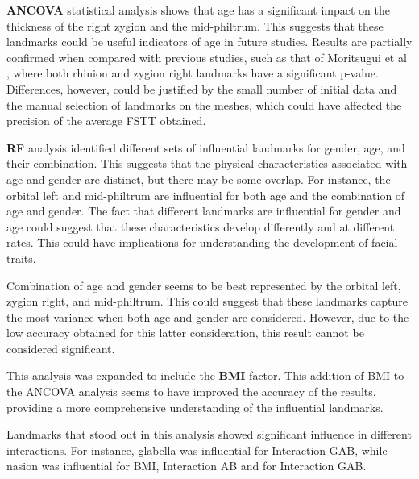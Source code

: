 \documentclass[journal,article,submit,pdftex,moreauthors]{Definitions/mdpi}
\begin{document}
\textbf{ANCOVA} statistical analysis shows that age has a significant impact on the thickness of the right zygion and the mid-philtrum. This suggests that these landmarks could be useful indicators of age in future studies. Results are partially confirmed when compared with previous studies, such as that of Moritsugui et al \cite{ref26}, where both rhinion and zygion right landmarks have a significant p-value. Differences, however, could be justified by the small number of initial data and the manual selection of landmarks on the meshes, which could have affected the precision of the average FSTT obtained. 

\textbf{RF} analysis identified different sets of influential landmarks for gender, age, and their combination. This suggests that the physical characteristics associated with age and gender are distinct, but there may be some overlap. For instance, the orbital left and mid-philtrum are influential for both age and the combination of age and gender. The fact that different landmarks are influential for gender and age could suggest that these characteristics develop differently and at different rates. This could have implications for understanding the development of facial traits.

Combination of age and gender seems to be best represented by the orbital left, zygion right, and mid-philtrum. This could suggest that these landmarks capture the most variance when both age and gender are considered. However, due to the low accuracy obtained for this latter consideration, this result cannot be considered significant.

This analysis was expanded to include the \textbf{BMI} factor. This addition of BMI to the ANCOVA analysis seems to have improved the accuracy of the results, providing a more comprehensive understanding of the influential landmarks.

Landmarks that stood out in this analysis showed significant influence in different interactions. For instance, glabella was influential for Interaction GAB, while nasion was influential for BMI, Interaction AB and for Interaction GAB.
\end{document}
